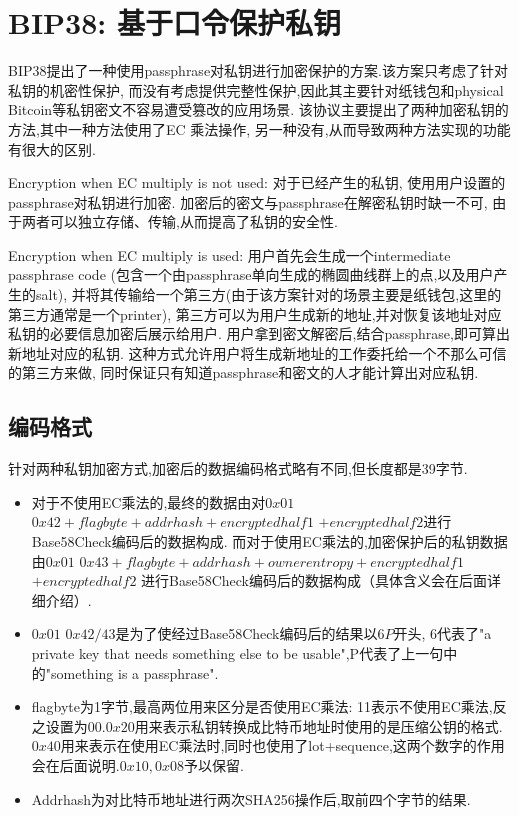\section{BIP38: 基于口令保护私钥}

BIP38提出了一种使用passphrase对私钥进行加密保护的方案.该方案只考虑了针对私钥的机密性保护,
而没有考虑提供完整性保护,因此其主要针对纸钱包和physical Bitcoin等私钥密文不容易遭受篡改的应用场景.
该协议主要提出了两种加密私钥的方法,其中一种方法使用了EC 乘法操作,
另一种没有,从而导致两种方法实现的功能有很大的区别.

Encryption when EC multiply is not used: 对于已经产生的私钥,
使用用户设置的passphrase对私钥进行加密.
加密后的密文与passphrase在解密私钥时缺一不可,
由于两者可以独立存储、传输,从而提高了私钥的安全性.

Encryption when EC multiply is used: 用户首先会生成一个intermediate passphrase code 
(包含一个由passphrase单向生成的椭圆曲线群上的点,以及用户产生的salt),
并将其传输给一个第三方(由于该方案针对的场景主要是纸钱包,这里的第三方通常是一个printer),
第三方可以为用户生成新的地址,并对恢复该地址对应私钥的必要信息加密后展示给用户.
用户拿到密文解密后,结合passphrase,即可算出新地址对应的私钥.
这种方式允许用户将生成新地址的工作委托给一个不那么可信的第三方来做,
同时保证只有知道passphrase和密文的人才能计算出对应私钥.

\subsection{ 编码格式}

针对两种私钥加密方式,加密后的数据编码格式略有不同,但长度都是39字节.

\begin{itemize}
\item 对于不使用EC乘法的,最终的数据由对$0x01$ $0x42+ flagbyte+ addrhash+ encryptedhalf1$ 
 $+ encryptedhalf2$进行Base58Check编码后的数据构成.
而对于使用EC乘法的,加密保护后的私钥数据由$0x01$
 $0x43+ flagbyte+ addrhash+ ownerentropy+ encryptedhalf1$ $+ encryptedhalf2$
 进行Base58Check编码后的数据构成（具体含义会在后面详细介绍）.

\item $0x01$ $0x42/43$是为了使经过Base58Check编码后的结果以$6P$开头,
6代表了"a private key that needs something else to be usable",P代表了上一句中的"something is a passphrase".

\item flagbyte为1字节,最高两位用来区分是否使用EC乘法:
11表示不使用EC乘法,反之设置为00.$0x20$用来表示私钥转换成比特币地址时使用的是压缩公钥的格式.
$0x40$用来表示在使用EC乘法时,同时也使用了lot+sequence,这两个数字的作用会在后面说明.$0x10,0x08$予以保留.

\item Addrhash为对比特币地址进行两次SHA256操作后,取前四个字节的结果.
\end{itemize}

